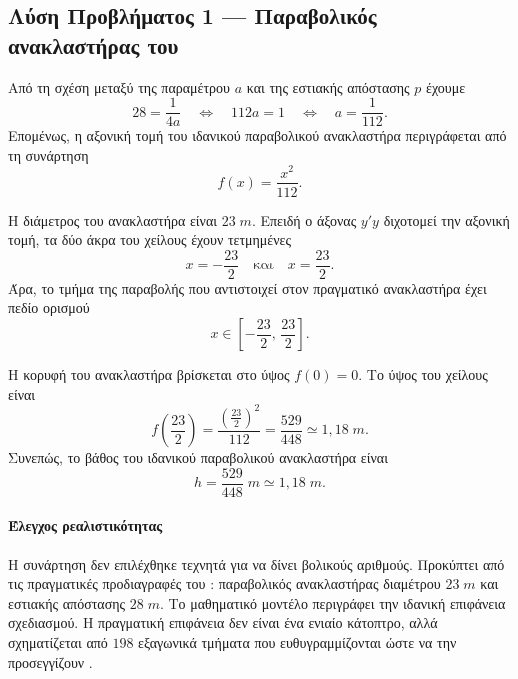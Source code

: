 \subsection*{Λύση Προβλήματος 1 --- Παραβολικός ανακλαστήρας του }

\begin{alist}
  \item Από τη σχέση μεταξύ της παραμέτρου $a$ και της εστιακής
        απόστασης $p$ έχουμε
        \[
          28=\frac{1}{4a}
          \quad\Longleftrightarrow\quad
          112a=1
          \quad\Longleftrightarrow\quad
          a=\frac{1}{112}.
        \]
        Επομένως, η αξονική τομή του ιδανικού παραβολικού ανακλαστήρα
        περιγράφεται από τη συνάρτηση
        \[
          {f(x)=\frac{x^2}{112}}.
        \]

  \item Η διάμετρος του ανακλαστήρα είναι $23\;\si{m}$. Επειδή ο άξονας
        $y'y$ διχοτομεί την αξονική τομή, τα δύο άκρα του χείλους έχουν
        τετμημένες
        \[
          x=-\frac{23}{2}
          \quad\text{και}\quad
          x=\frac{23}{2}.
        \]
        Άρα, το τμήμα της παραβολής που αντιστοιχεί στον πραγματικό
        ανακλαστήρα έχει πεδίο ορισμού
        \[
          {x\in\left[-\frac{23}{2},\,\frac{23}{2}\right]}.
        \]

  \item Η κορυφή του ανακλαστήρα βρίσκεται στο ύψος $f(0)=0$. Το ύψος
        του χείλους είναι
        \[
          f\left(\frac{23}{2}\right)
          =\frac{\left(\frac{23}{2}\right)^2}{112}
          =\frac{529}{448}
          \simeq 1{,}18\;\si{m}.
        \]
        Συνεπώς, το βάθος του ιδανικού παραβολικού ανακλαστήρα είναι
        \[
          {h=\frac{529}{448}\;\si{m}\simeq1{,}18\;\si{m}}.
        \]
\end{alist}

\paragraph{Έλεγχος ρεαλιστικότητας}
Η συνάρτηση δεν επιλέχθηκε τεχνητά για να δίνει βολικούς αριθμούς.
Προκύπτει από τις πραγματικές προδιαγραφές του : παραβολικός
ανακλαστήρας διαμέτρου $23\;\si{m}$ και εστιακής απόστασης
$28\;\si{m}$. Το μαθηματικό μοντέλο περιγράφει την ιδανική επιφάνεια
σχεδιασμού. Η πραγματική επιφάνεια δεν είναι ένα ενιαίο κάτοπτρο, αλλά
σχηματίζεται από $198$ εξαγωνικά τμήματα που ευθυγραμμίζονται ώστε να
την προσεγγίζουν \cite{hayashida2015lstOptics}.
